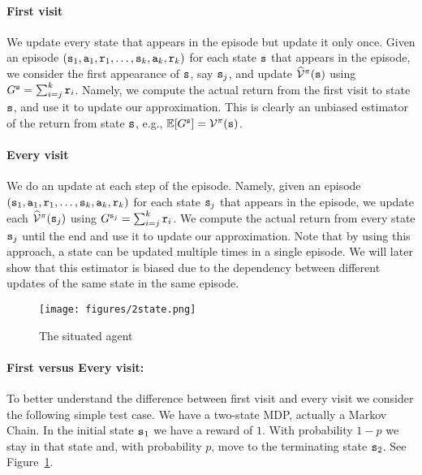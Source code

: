 \paragraph{First visit}
We update every state that appears in the episode but update it
only once. Given an episode $({\tt s}_1, {\tt a}_1, {\tt r}_1, \ldots
, {\tt s}_k,{\tt a}_k,{\tt r}_k)$ for each state ${\tt s}$ that appears
in the episode, we consider the first appearance of ${\tt s}$, say
${\tt s}_j$, and update $\widehat{\mathcal{V}}^\pi({\tt s})$ using
$G^{\tt s}=\sum_{i=j}^k {\tt r}_i$. Namely, we compute the actual
return from the first visit to state ${\tt s}$, and use it to update
our approximation. This is clearly an unbiased estimator of the
return from state ${\tt s}$, e.g.,
$\mathbb{E}[G^{\tt s}]=\mathcal{V}^\pi({\tt s})$.

\paragraph{Every visit}
We do an update at each step of the episode. Namely, given an
episode $({\tt s}_1, {\tt a}_1, {\tt r}_1, \ldots ,
{\tt s}_k,{\tt a}_k,{\tt r}_k)$ for each state ${\tt s}_j$ that
appears in the episode, we update each
$\widehat{\mathcal{V}}^\pi({\tt s}_j)$ using
$G^{{\tt s}_j}=\sum_{i=j}^k {\tt r}_i$. We compute the actual
return from every state ${\tt s}_j$ until the end and use it to update
our approximation. Note that by using this approach, a state can be updated multiple times
in  a single episode. We will later show that
this estimator is biased due to the dependency between different
updates of the same state in the same episode.

\begin{figure}
  \begin{centering}
 \texttt{[image: figures/2state.png]}\\
  \caption{The situated agent}\label{fig:2state}
  \end{centering}
\end{figure}

\paragraph{First versus Every visit:}
%
To better understand the difference between first visit and every
visit we consider the following simple test case. We have a two-state MDP, actually a Markov Chain. In the initial state ${\tt s}_1$ we have a reward of $1$. With probability $1-p$ we stay in that
state and, with probability $p$, move to the terminating state
${\tt s}_2$. See Figure~\ref{fig:2state}.

